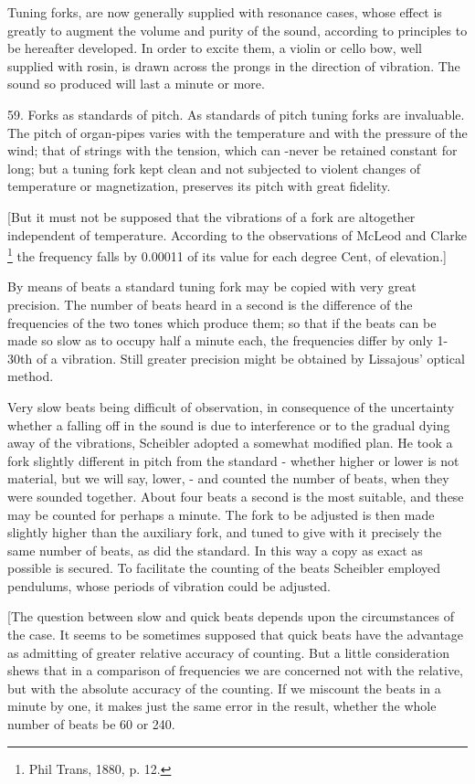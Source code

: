 Tuning forks, are now generally supplied with resonance cases, whose effect is
greatly to augment the volume and purity of the sound, according to principles
to be hereafter developed. In order to excite them, a violin or cello bow, well
supplied with rosin, is drawn across the prongs in the direction of vibration.
The sound so produced will last a minute or more.

59.  Forks as standards of pitch.
As standards of pitch tuning forks are invaluable. The pitch of organ-pipes
varies with the temperature and with the pressure of the wind; that of strings
with the tension, which can -never be retained constant for long; but a tuning
fork kept clean and not subjected to violent changes of temperature or
magnetization, preserves its pitch with great fidelity.

[But it must not be supposed that the vibrations of a fork are altogether
independent of temperature. According to the observations of McLeod and Clarke
\footnote{Phil Trans, 1880, p. 12.} the frequency falls by 0.00011 of its value
for each degree Cent, of elevation.]

By means of beats a standard tuning fork may be copied with very great
precision. The number of beats heard in a second is the difference of the
frequencies of the two tones which produce them; so that if the beats can be
made so slow as to occupy half a minute each, the frequencies differ by only
1-30th of a vibration. Still greater precision might be obtained by Lissajous'
optical method.

Very slow beats being difficult of observation, in consequence of the
uncertainty whether a falling off in the sound is due to interference or to the
gradual dying away of the vibrations, Scheibler adopted a somewhat modified
plan. He took a fork slightly different in pitch from the standard - whether
higher or lower is not material, but we will say, lower, - and counted the
number of beats, when they were sounded together.  About four beats a second is
the most suitable, and these may be counted for perhaps a minute. The fork to
be adjusted is then made slightly higher than the auxiliary fork, and tuned to
give with it precisely the same number of beats, as did the standard. In this
way a copy as exact as possible is secured. To facilitate the counting of the
beats Scheibler employed pendulums, whose periods of vibration could be
adjusted.

[The question between slow and quick beats depends upon the circumstances of
the case. It seems to be sometimes supposed that quick beats have the advantage
as admitting of greater relative accuracy of counting. But a little
consideration shews that in a comparison of frequencies we are concerned not
with the relative, but with the absolute accuracy of the counting. If we
miscount the beats in a minute by one, it makes just the same error in the
result, whether the whole number of beats be 60 or 240.


